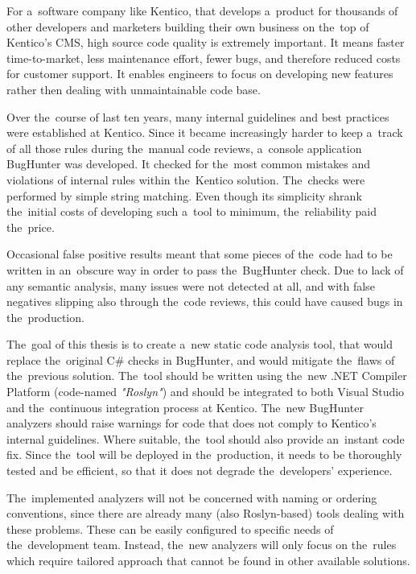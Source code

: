 \documentclass[
  digital, %
  table,   %
  lof,     %
  lot,     %
  oneside,
]{fithesis3}
\begin{document}
For a~software company like Kentico, that develops a~product for thousands of other developers and marketers building their own business on the~top of Kentico's CMS, high source code quality is extremely important. It means faster time-to-market, less maintenance effort, fewer bugs, and therefore reduced costs for customer support. It enables engineers to focus on developing new features rather then dealing with unmaintainable code base. 


Over the~course of last ten years, many internal guidelines and best practices were established at Kentico. Since it became increasingly harder to keep a~track of all those rules during the~manual code reviews, a~console application BugHunter was developed. It checked for the~most common mistakes and violations of internal rules within the~Kentico solution. The~checks were performed by simple string matching. Even though its simplicity shrank the~initial costs of developing such a~tool to minimum, the~reliability paid the~price. 

Occasional false positive results meant that some pieces of the~code had to be written in an~obscure way in order to pass the~BugHunter check. Due to lack of any semantic analysis, many issues were not detected at all, and with false negatives slipping also through the~code reviews, this could have caused bugs in the~production. 

The~goal of this thesis is to create a~new static code analysis tool, that would replace the~original C\# checks in BugHunter, and would mitigate the~flaws of the~previous solution. The~tool should be written using the~new .NET Compiler Platform (code-named \textit{"Roslyn"}) and should be integrated to both Visual Studio and the~continuous integration process at Kentico. The~new BugHunter analyzers should raise warnings for code that does not comply to Kentico's internal guidelines. Where suitable, the~tool should also provide an~instant code fix. Since the~tool will be deployed in the~production, it needs to be thoroughly tested and be efficient, so that it does not degrade the~developers' experience.

The~implemented analyzers will not be concerned with naming or ordering conventions, since there are already many (also Roslyn-based) tools dealing with these problems. These can be easily configured to specific needs of the~development team. Instead, the~new analyzers will only focus on the~rules which require tailored approach that cannot be found in other available solutions. 
\end{document}
